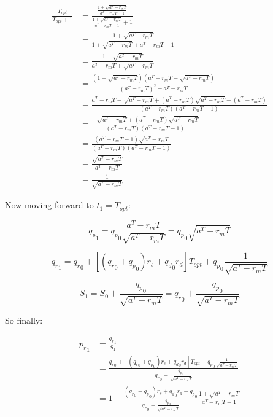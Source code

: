 \documentclass{article}
\begin{document}
\begin{equation}
  \label{eq:conservative_issuance_proportion}
  \begin{split}
  \frac{T_{opt}}{T_{opt} + 1} & = \frac{\frac{1+ \sqrt{a^T - r_mT}}{a^T - r_mT - 1}}{\frac{1+ \sqrt{a^T - r_mT}}{a^T - r_mT - 1} + 1} \\
  & = \frac{1+ \sqrt{a^T - r_mT}}{1+ \sqrt{a^T - r_mT} + a^T - r_mT - 1} \\
  & = \frac{1+ \sqrt{a^T - r_mT}}{a^T - r_mT + \sqrt{a^T - r_mT}} \\
  & = \frac{(1+ \sqrt{a^T - r_mT})(a^T - r_mT - \sqrt{a^T - r_mT})}{(a^T - r_mT)^2 + a^T - r_mT} \\
  & = \frac{a^T - r_mT - \sqrt{a^T - r_mT} + (a^T - r_mT)\sqrt{a^T - r_mT} - (a^T - r_mT)}{(a^T - r_mT)(a^T - r_mT - 1)} \\
  & = \frac{- \sqrt{a^T - r_mT} + (a^T - r_mT)\sqrt{a^T - r_mT}}{(a^T - r_mT)(a^T - r_mT - 1)} \\
  & = \frac{(a^T - r_mT - 1)\sqrt{a^T - r_mT}}{(a^T - r_mT)(a^T - r_mT - 1)} \\
  & = \frac{\sqrt{a^T - r_mT}}{a^T - r_mT} \\
  & = \frac{1}{\sqrt{a^T - r_mT}}
  \end{split}
\end{equation}

Now moving forward to $t_1 = T_{opt}$:

\[
{q_p}_1 = {q_p}_0 \frac{a^T -r_mT}{\sqrt{a^T -r_mT}} = {q_p}_0 \sqrt{a^T - r_mT}
\]

\[
{q_r}_1 = {q_r}_0 + [({q_r}_0 + {q_p}_0)r_s + {q_d}_0 r_d] T_{opt} + {q_p}_0 \frac{1}{\sqrt{a^T - r_mT}}
\]

\[
S_1 = S_0 + \frac{{q_p}_0}{\sqrt{a^T - r_mT}} = {q_r}_0 + \frac{{q_p}_0}{\sqrt{a^T - r_mT}}
\]

So finally:

\begin{equation}
  \label{eq:conservative_p_r_1}
  \begin{split}
    {p_r}_1 & = \frac{{q_r}_1}{S_1} \\
    & = \frac{{q_r}_0 + [({q_r}_0 + {q_p}_0)r_s + {q_d}_0 r_d] T_{opt} + {q_p}_0 \frac{1}{\sqrt{a^T - r_mT}}}{{q_r}_0 + \frac{{q_p}_0}{\sqrt{a^T - r_mT}}} \\
    & = 1 + \frac{({q_r}_0 + {q_p}_0)r_s + {q_d}_0 r_d + {q_p}_0}{{q_r}_0 + \frac{{q_p}_0}{\sqrt{a^T - r_mT}}} \frac{1+ \sqrt{a^T - r_mT}}{a^T - r_mT - 1} \\
  \end{split}
\end{equation}
\end{document}
